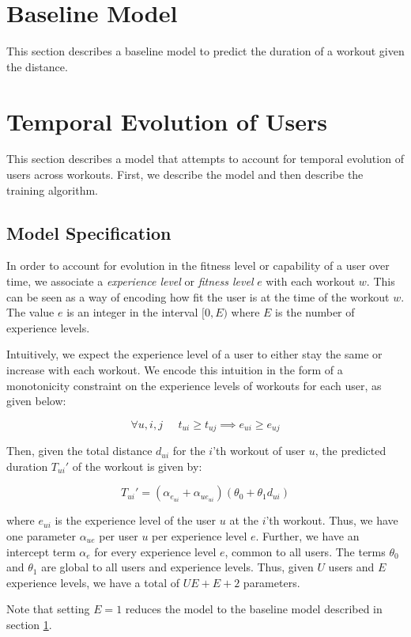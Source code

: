 \documentclass{acm_proc_article-sp}
\begin{document}
\section{Baseline Model}
\label{secBaselineModel}
This section describes a baseline model to predict the duration of a workout given the distance.

\section{Temporal Evolution of Users}
\label{secTemporalModelUsers}
This section describes a model that attempts to account for temporal evolution of users across workouts. First, we describe the model and then describe the training algorithm.

\subsection{Model Specification}
In order to account for evolution in the fitness level or capability of a user over time,  we associate a \emph{experience level} or \emph{fitness level} $e$ with each workout $w$. This can be seen as a way of encoding how fit the user is at the time of the workout $w$. The value $e$ is an integer in the interval $[0, E)$ where $E$ is the number of experience levels. 

Intuitively, we expect the experience level of a user to either stay the same or increase with each workout. We encode this intuition in the form of a monotonicity constraint on the experience levels of workouts for each user, as given below:

$$\forall u,i,j \;\;\;\;\; t_{ui} \geq t_{uj} \implies e_{ui} \geq e_{uj}$$

Then, given the total distance $d_{ui}$ for the $i$'th workout of user $u$, the predicted duration $T_{ui}'$ of the workout is given by:

$$T_{ui}' = (\alpha_{e_{ui}} + \alpha_{ue_{ui}})(\theta_0 + \theta_1 d_{ui})$$

where $e_{ui}$ is the experience level of the user $u$ at the $i$'th workout. Thus, we have one parameter $\alpha_{ue}$ per user $u$ per experience level $e$. Further, we have an intercept term $\alpha_e$ for every experience level $e$, common to all users. The terms $\theta_0$ and $\theta_1$ are global to all users and experience levels. Thus, given $U$ users and $E$ experience levels, we have a total of $UE + E + 2$ parameters.

Note that setting $E = 1$ reduces the model to the baseline model described in section \ref{secBaselineModel}.
\end{document}
